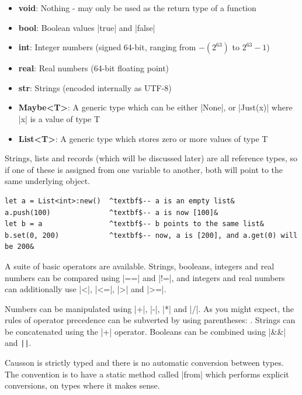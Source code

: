 \documentclass[11pt]{report}
\begin{document}
\begin{itemize}[nosep, topsep=0pt]
    \item \textbf{void}: Nothing - may only be used as the return type of a function

    \item \textbf{bool}: Boolean values |true| and |false|
    
    \item \textbf{int}: Integer numbers (signed 64-bit, ranging from $-(2^{63})$ to $2^{63}-1$)
    
    \item \textbf{real}: Real numbers (64-bit floating point)
    
    \item \textbf{str}: Strings (encoded internally as UTF-8)
    
    \item \textbf{Maybe<T>}: A generic type which can be either |None|, or |Just(x)| where |x| is a value of type T
    
    \item \textbf{List<T>}: A generic type which stores zero or more values of type T
\end{itemize}

Strings, lists and records (which will be discussed later) are all reference types, so if one of these is assigned from one variable to another, both will point to the same underlying object.

\begin{Verbatim}[commandchars=^$&]
let a = List<int>:new()  ^textbf$-- a is an empty list&
a.push(100)              ^textbf$-- a is now [100]&
let b = a                ^textbf$-- b points to the same list&
b.set(0, 200)            ^textbf$-- now, a is [200], and a.get(0) will be 200&
\end{Verbatim}

A suite of basic operators are available. Strings, booleans, integers and real numbers can be compared using |==| and |!=|, and integers and real numbers can additionally use |<|, |<=|, |>| and |>=|.

Numbers can be manipulated using |+|, |-|, |*| and |/|. As you might expect, the rules of operator precedence can be subverted by using parentheses: .  Strings can be concatenated using the |+| operator. Booleans can be combined using |&&| and \Verb/||/.

Causson is strictly typed and there is no automatic conversion between types. The convention is to have a static method called |from| which performs explicit conversions, on types where it makes sense.
\end{document}
